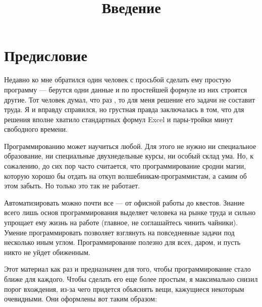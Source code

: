 \documentclass{article}
\begin{document}


\title{\textbf{\Huge Введение}}
\author{}
\date{}

\maketitle %

\section*{Предисловие}

Недавно ко мне обратился один человек с просьбой сделать ему простую программу --- берутся одни данные и по простейшей формуле из них строятся другие. Тот человек думал, что раз \grqq, то для меня решение его задачи не составит труда. Я и вправду справился, но грустная правда заключалась в том, что для решения вполне хватило стандартных формул Excel и пары-тройки минут свободного времени.

Программированию может научиться любой. Для этого не нужно ни специальное образование, ни специальные двухнедельные курсы, ни особый склад ума. Но, к сожалению, до сих пор часто считается, что программирование сродни магии, которую хорошо бы отдать на откуп волшебникам-программистам, а самим об этом забыть. Но только это так не работает. 

Автоматизировать можно почти все --- от офисной работы до квестов. Знание всего лишь основ программирования выделяет человека на рынке труда и сильно упрощает ему жизнь на работе (главное, не соглашайтесь чинить чайники). Умение программировать позволяет взглянуть на повседневные задачи под несколько иным углом. Программирование полезно для всех, даром, и пусть никто не уйдет обиженным.

Этот материал как раз и предназначен для того, чтобы программирование стало ближе для каждого. Чтобы сделать его еще более простым, я максимально снизил порог вхождения, из-за чего придется объяснять вещи, кажущиеся некоторым очевидными. Они оформлены вот таким образом:
\end{document}
